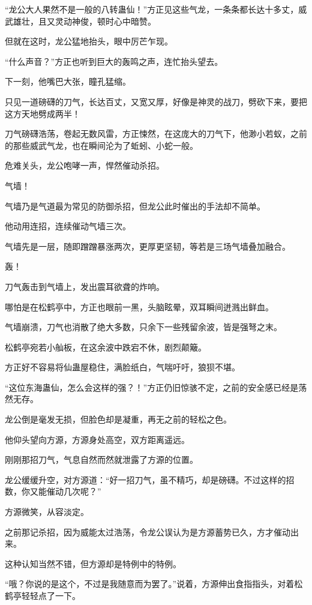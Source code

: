 \begin{this_body}
“龙公大人果然不是一般的八转蛊仙！”方正见这些气龙，一条条都长达十多丈，威武雄壮，且又灵动神俊，顿时心中暗赞。

但就在这时，龙公猛地抬头，眼中厉芒乍现。

“什么声音？”方正也听到巨大的轰鸣之声，连忙抬头望去。

下一刻，他嘴巴大张，瞳孔猛缩。

只见一道磅礴的刀气，长达百丈，又宽又厚，好像是神灵的战刀，劈砍下来，要把这方天地劈成两半！

刀气磅礴浩荡，卷起无数风雷，方正悚然，在这庞大的刀气下，他渺小若蚁，之前的那些威武气龙，也在瞬间沦为了蚯蚓、小蛇一般。

危难关头，龙公咆哮一声，悍然催动杀招。

气墙！

气墙乃是气道最为常见的防御杀招，但龙公此时催出的手法却不简单。

他动用连招，连续催动气墙三次。

气墙先是一层，随即蹭蹭暴涨两次，更厚更坚韧，等若是三场气墙叠加融合。

轰！

刀气轰击到气墙上，发出震耳欲聋的炸响。

哪怕是在松鹤亭中，方正也眼前一黑，头脑眩晕，双耳瞬间迸溅出鲜血。

气墙崩溃，刀气也消散了绝大多数，只余下一些残留余波，皆是强弩之末。

松鹤亭宛若小舢板，在这余波中跌宕不休，剧烈颠簸。

方正好不容易将仙蛊屋稳住，满脸纸白，气喘吁吁，狼狈不堪。

“这位东海蛊仙，怎么会这样的强？！”方正仍旧惊骇不定，之前的安全感已经是荡然无存。

龙公倒是毫发无损，但脸色却是凝重，再无之前的轻松之色。

他仰头望向方源，方源身处高空，双方距离遥远。

刚刚那招刀气，气息自然而然就泄露了方源的位置。

龙公缓缓升空，对方源道：“好一招刀气，虽不精巧，却是磅礴。不过这样的招数，你又能催动几次呢？”

方源微笑，从容淡定。

之前那记杀招，因为威能太过浩荡，令龙公误认为是方源蓄势已久，方才催动出来。

这种认知当然不错，但方源却是特例中的特例。

“哦？你说的是这个，不过是我随意而为罢了。”说着，方源伸出食指指头，对着松鹤亭轻轻点了一下。


\end{this_body}
